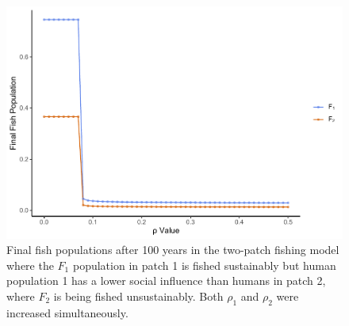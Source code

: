 \documentclass[
]{article}
\begin{document}
\begin{figure}
\centering
\includegraphics{ReviewerRhoTest_files/figure-latex/rhoExploreGraph-1.pdf}
\caption{\label{fig:rhoExploreGraph}Final fish populations after 100 years in the two-patch fishing model where the \(F_1\) population in patch 1 is fished sustainably but human population 1 has a lower social influence than humans in patch 2, where \(F_2\) is being fished unsustainably. Both \(\rho_1\) and \(\rho_2\) were increased simultaneously. \label{rhoExploreGraph}}
\end{figure}
\end{document}
